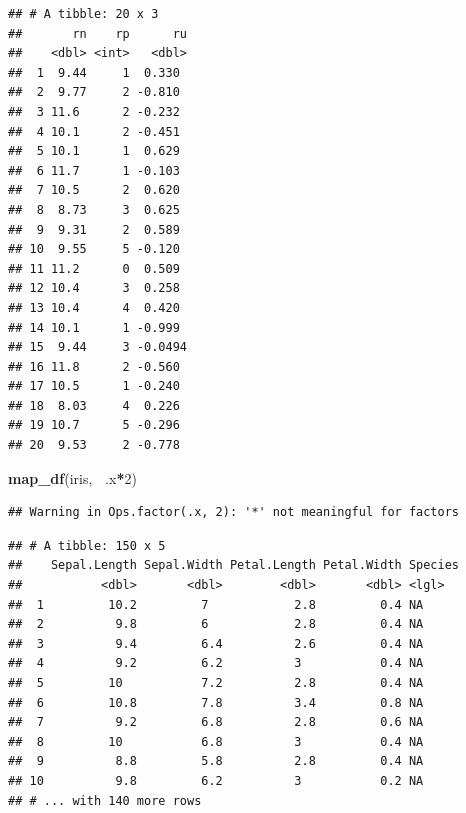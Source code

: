 \documentclass[]{book}
\newenvironment{Shaded}{\begin{snugshade}}{\end{snugshade}}
\newcommand{\DecValTok}[1]{\textcolor[rgb]{0.00,0.00,0.81}{#1}}
\newcommand{\KeywordTok}[1]{\textcolor[rgb]{0.13,0.29,0.53}{\textbf{#1}}}
\newcommand{\NormalTok}[1]{#1}
\newcommand{\OperatorTok}[1]{\textcolor[rgb]{0.81,0.36,0.00}{\textbf{#1}}}
\newcommand{\StringTok}[1]{\textcolor[rgb]{0.31,0.60,0.02}{#1}}
\theoremstyle{definition}
\theoremstyle{definition}
\theoremstyle{definition}
\theoremstyle{remark}
\begin{document}
\begin{verbatim}
## # A tibble: 20 x 3
##       rn    rp      ru
##    <dbl> <int>   <dbl>
##  1  9.44     1  0.330 
##  2  9.77     2 -0.810 
##  3 11.6      2 -0.232 
##  4 10.1      2 -0.451 
##  5 10.1      1  0.629 
##  6 11.7      1 -0.103 
##  7 10.5      2  0.620 
##  8  8.73     3  0.625 
##  9  9.31     2  0.589 
## 10  9.55     5 -0.120 
## 11 11.2      0  0.509 
## 12 10.4      3  0.258 
## 13 10.4      4  0.420 
## 14 10.1      1 -0.999 
## 15  9.44     3 -0.0494
## 16 11.8      2 -0.560 
## 17 10.5      1 -0.240 
## 18  8.03     4  0.226 
## 19 10.7      5 -0.296 
## 20  9.53     2 -0.778
\end{verbatim}

\begin{Shaded}
\begin{Highlighting}[]
\KeywordTok{map_df}\NormalTok{(iris, }\OperatorTok{~}\NormalTok{.x}\OperatorTok{*}\DecValTok{2}\NormalTok{)}
\end{Highlighting}
\end{Shaded}

\begin{verbatim}
## Warning in Ops.factor(.x, 2): '*' not meaningful for factors
\end{verbatim}

\begin{verbatim}
## # A tibble: 150 x 5
##    Sepal.Length Sepal.Width Petal.Length Petal.Width Species
##           <dbl>       <dbl>        <dbl>       <dbl> <lgl>  
##  1         10.2         7            2.8         0.4 NA     
##  2          9.8         6            2.8         0.4 NA     
##  3          9.4         6.4          2.6         0.4 NA     
##  4          9.2         6.2          3           0.4 NA     
##  5         10           7.2          2.8         0.4 NA     
##  6         10.8         7.8          3.4         0.8 NA     
##  7          9.2         6.8          2.8         0.6 NA     
##  8         10           6.8          3           0.4 NA     
##  9          8.8         5.8          2.8         0.4 NA     
## 10          9.8         6.2          3           0.2 NA     
## # ... with 140 more rows
\end{verbatim}

\begin{Shaded}
\end{Shaded}
\end{document}

